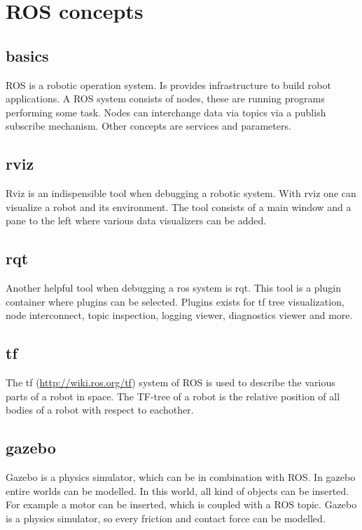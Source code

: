 \documentclass[a4paper]{article}
\begin{document}
\clearpage

\section{ROS concepts}
\subsection{basics}
ROS is a robotic operation system. Is provides infrastructure to build robot applications.
A ROS system consists of nodes, these are running programs performing some task. Nodes can
interchange data via topics via a publish subscribe mechanism. Other concepts are services
and parameters.

\subsection{rviz}
Rviz is an indispensible tool when debugging a robotic system. With rviz one can visualize a robot
and its environment. The tool consists of a main window and a pane to the left where various data
visualizers can be added.

\subsection{rqt}
Another helpful tool when debugging a ros system is rqt. This tool is a plugin container where plugins
can be selected. Plugins exists for tf tree visualization, node interconnect, topic inspection,
logging viewer, diagnostics viewer and more.

\subsection{tf}
The tf (\url{http://wiki.ros.org/tf}) system of ROS is used to describe the various parts of 
a robot in space. The TF-tree of a robot is the relative position of all bodies of a robot
with respect to eachother.

\subsection{gazebo}
Gazebo is a physics simulator, which can be in combination with ROS. In gazebo entire worlds
can be modelled. In this world, all kind of objects can be inserted. For example a motor can
be inserted, which is coupled with a ROS topic. Gazebo is a physics simulator, so every friction
and contact force can be modelled.
\end{document}

